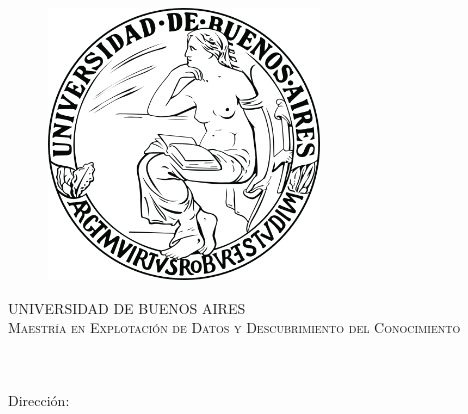
\FloatBarrier
\vspace{28.5mm}
\begin{figure}[H]
    \begin{center}
        \includegraphics[width=72mm]{img/institucional/logo-uba.png}
    \end{center}
\end{figure}


\begin{center}



\textsc{\Large UNIVERSIDAD DE BUENOS AIRES}\\[4em]

\textsc{\Large Maestría en Explotación de Datos y Descubrimiento del Conocimiento}\\[4em]


\vspace{20mm}
\textsc{\Large \variableTituloTesis    } 



\vspace{20mm}
\textsc{\Large \variableTesinando}\\[1em]
\textsc{\Large \variableAnho}\\[1em]

\large Dirección: \\ \variableDireccionUno


\end{center}

\vspace*{\fill}






